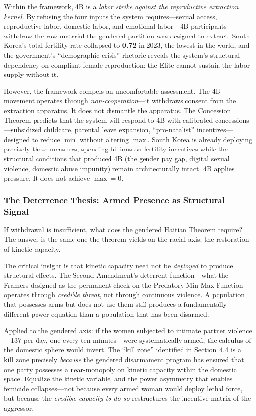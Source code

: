 \documentclass[12pt,openany]{book}
\begin{document}
Within the framework, 4B is a \textit{labor strike against the reproductive extraction kernel}. By refusing the four inputs the system requires---sexual access, reproductive labor, domestic labor, and emotional labor---4B participants withdraw the raw material the gendered partition was designed to extract. South Korea's total fertility rate collapsed to \textbf{0.72} in 2023, the lowest in the world, and the government's ``demographic crisis'' rhetoric reveals the system's structural dependency on compliant female reproduction: the Elite cannot sustain the labor supply without it.

However, the framework compels an uncomfortable assessment. The 4B movement operates through \textit{non-cooperation}---it withdraws consent from the extraction apparatus. It does not dismantle the apparatus. The Concession Theorem predicts that the system will respond to 4B with calibrated concessions---subsidized childcare, parental leave expansion, ``pro-natalist'' incentives---designed to reduce $\min$ without altering $\max$. South Korea is already deploying precisely these measures, spending billions on fertility incentives while the structural conditions that produced 4B (the gender pay gap, digital sexual violence, domestic abuse impunity) remain architecturally intact. 4B applies pressure. It does not achieve $\max = 0$.

\subsubsection{The Deterrence Thesis: Armed Presence as Structural Signal}

If withdrawal is insufficient, what does the gendered Haitian Theorem require? The answer is the same one the theorem yields on the racial axis: the restoration of kinetic capacity.

The critical insight is that kinetic capacity need not be \textit{deployed} to produce structural effects. The Second Amendment's deterrent function---what the Framers designed as the permanent check on the Predatory Min-Max Function---operates through \textit{credible threat}, not through continuous violence. A population that possesses arms but does not use them still produces a fundamentally different power equation than a population that has been disarmed.

Applied to the gendered axis: if the women subjected to intimate partner violence---137 per day, one every ten minutes---were systematically armed, the calculus of the domestic sphere would invert. The ``kill zone'' identified in Section~4.4 is a kill zone precisely \textit{because} the gendered disarmament program has ensured that one party possesses a near-monopoly on kinetic capacity within the domestic space. Equalize the kinetic variable, and the power asymmetry that enables femicide collapses---not because every armed woman would deploy lethal force, but because the \textit{credible capacity to do so} restructures the incentive matrix of the aggressor.
\end{document}

